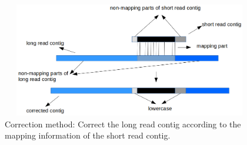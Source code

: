 \documentclass{llncs}
\begin{document}
\begin{figure}[htbp]
\centerline{\includegraphics[width=12cm, height=5cm]{BACAlgorithm1.png}}
\caption{Correction method: Correct the long read contig according to the mapping information of the short read contig.}
\label{correction}
\end{figure}
\end{document}

